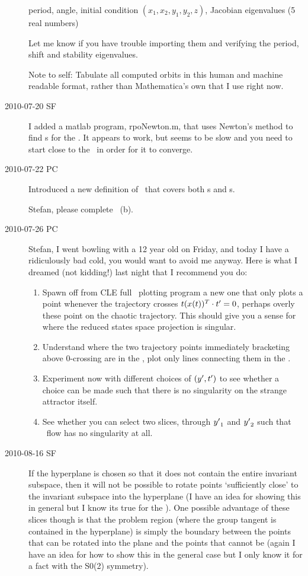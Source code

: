 \begin{description}
period, angle, initial condition $(x_1,x_2,y_1,y_2,z)$,
Jacobian eigenvalues (5 real numbers)

Let me know if you have trouble importing them and verifying
the period, shift and stability eigenvalues.

Note to self: Tabulate all computed orbits in this human and machine readable format,
rather than Mathematica's own that I use right now.


\item[2010-07-20 SF]
I added a matlab program, rpoNewton.m, that uses Newton's
method to find \rpo s for the \cLe. It appears to work, but
seems to be slow and you need to start close to the \rpo\ in
order for it to converge.


\item[2010-07-22 PC]
Introduced a new definition  of \FloquetM\ that covers
both \po s and \rpo s.

Stefan, please complete ~(b).

\item[2010-07-26 PC]
Stefan, I went bowling with a 12 year old on Friday, and
today I have a ridiculously bad cold, you would want to avoid
me anyway. Here is what I dreamed (not kidding!) last night
that I recommend you do:

\begin{enumerate}
    \item
Spawn off from CLE full \statesp\ plotting program a new
one that only plots a point whenever the trajectory crosses
$t(x(t))^T \cdot t'_{} =0$, perhaps overly these point on the chaotic
trajectory. This should give you a sense for where the
reduced states space projection is singular.
    \item
Understand where the two trajectory points immediately
bracketing above 0-crossing are in the \reducedsp,
plot only lines connecting them in the \reducedsp.
    \item
Experiment now with different choices of $({y'},t'_{})$ to see
whether a choice can be made such that there is no
singularity on the strange attractor itself.
    \item
See whether you can select two slices, through ${y'}_1$ and ${y'}_2$
such that \reducedsp\ flow has no singularity at
all.
\end{enumerate}


\item[2010-08-16 SF]
If the hyperplane is chosen so that it does not contain the
entire invariant subspace, then it will not be possible to
rotate points `sufficiently close' to the invariant subspace
into the hyperplane (I have an idea for showing this in
general but I know its true for the \cLe ). One possible
advantage of these slices though is that the problem region
(where the group tangent is contained in the hyperplane) is
simply the boundary between the points that can be rotated
into the plane and the points that cannot be (again I have an
idea for how to show this in the general case but I only know
it for a fact with the S0(2) symmetry).


\end{description}
